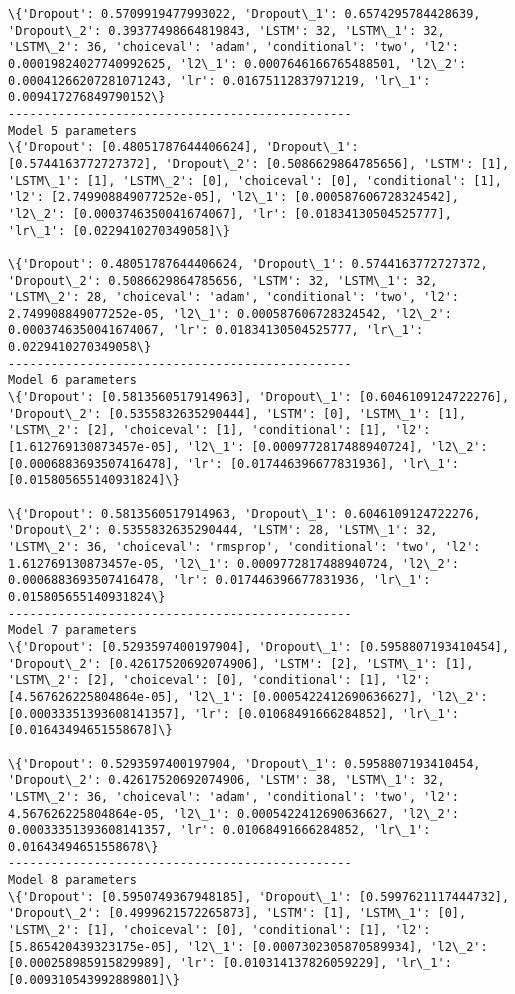 \documentclass[11pt]{article}
\begin{document}
\begin{Verbatim}[commandchars=\\\{\}]
\{'Dropout': 0.5709919477993022, 'Dropout\_1': 0.6574295784428639, 'Dropout\_2': 0.39377498664819843, 'LSTM': 32, 'LSTM\_1': 32, 'LSTM\_2': 36, 'choiceval': 'adam', 'conditional': 'two', 'l2': 0.00019824027740992625, 'l2\_1': 0.0007646166765488501, 'l2\_2': 0.00041266207281071243, 'lr': 0.01675112837971219, 'lr\_1': 0.009417276849790152\}
------------------------------------------------
Model 5 parameters
\{'Dropout': [0.48051787644406624], 'Dropout\_1': [0.5744163772727372], 'Dropout\_2': [0.5086629864785656], 'LSTM': [1], 'LSTM\_1': [1], 'LSTM\_2': [0], 'choiceval': [0], 'conditional': [1], 'l2': [2.749908849077252e-05], 'l2\_1': [0.000587606728324542], 'l2\_2': [0.0003746350041674067], 'lr': [0.01834130504525777], 'lr\_1': [0.0229410270349058]\}

\{'Dropout': 0.48051787644406624, 'Dropout\_1': 0.5744163772727372, 'Dropout\_2': 0.5086629864785656, 'LSTM': 32, 'LSTM\_1': 32, 'LSTM\_2': 28, 'choiceval': 'adam', 'conditional': 'two', 'l2': 2.749908849077252e-05, 'l2\_1': 0.000587606728324542, 'l2\_2': 0.0003746350041674067, 'lr': 0.01834130504525777, 'lr\_1': 0.0229410270349058\}
------------------------------------------------
Model 6 parameters
\{'Dropout': [0.5813560517914963], 'Dropout\_1': [0.6046109124722276], 'Dropout\_2': [0.5355832635290444], 'LSTM': [0], 'LSTM\_1': [1], 'LSTM\_2': [2], 'choiceval': [1], 'conditional': [1], 'l2': [1.612769130873457e-05], 'l2\_1': [0.0009772817488940724], 'l2\_2': [0.0006883693507416478], 'lr': [0.017446396677831936], 'lr\_1': [0.015805655140931824]\}

\{'Dropout': 0.5813560517914963, 'Dropout\_1': 0.6046109124722276, 'Dropout\_2': 0.5355832635290444, 'LSTM': 28, 'LSTM\_1': 32, 'LSTM\_2': 36, 'choiceval': 'rmsprop', 'conditional': 'two', 'l2': 1.612769130873457e-05, 'l2\_1': 0.0009772817488940724, 'l2\_2': 0.0006883693507416478, 'lr': 0.017446396677831936, 'lr\_1': 0.015805655140931824\}
------------------------------------------------
Model 7 parameters
\{'Dropout': [0.5293597400197904], 'Dropout\_1': [0.5958807193410454], 'Dropout\_2': [0.42617520692074906], 'LSTM': [2], 'LSTM\_1': [1], 'LSTM\_2': [2], 'choiceval': [0], 'conditional': [1], 'l2': [4.567626225804864e-05], 'l2\_1': [0.0005422412690636627], 'l2\_2': [0.00033351393608141357], 'lr': [0.01068491666284852], 'lr\_1': [0.01643494651558678]\}

\{'Dropout': 0.5293597400197904, 'Dropout\_1': 0.5958807193410454, 'Dropout\_2': 0.42617520692074906, 'LSTM': 38, 'LSTM\_1': 32, 'LSTM\_2': 36, 'choiceval': 'adam', 'conditional': 'two', 'l2': 4.567626225804864e-05, 'l2\_1': 0.0005422412690636627, 'l2\_2': 0.00033351393608141357, 'lr': 0.01068491666284852, 'lr\_1': 0.01643494651558678\}
------------------------------------------------
Model 8 parameters
\{'Dropout': [0.5950749367948185], 'Dropout\_1': [0.5997621117444732], 'Dropout\_2': [0.4999621572265873], 'LSTM': [1], 'LSTM\_1': [0], 'LSTM\_2': [1], 'choiceval': [0], 'conditional': [1], 'l2': [5.865420439323175e-05], 'l2\_1': [0.0007302305870589934], 'l2\_2': [0.000258985915829989], 'lr': [0.010314137826059229], 'lr\_1': [0.009310543992889801]\}


\end{Verbatim}
\end{document}
